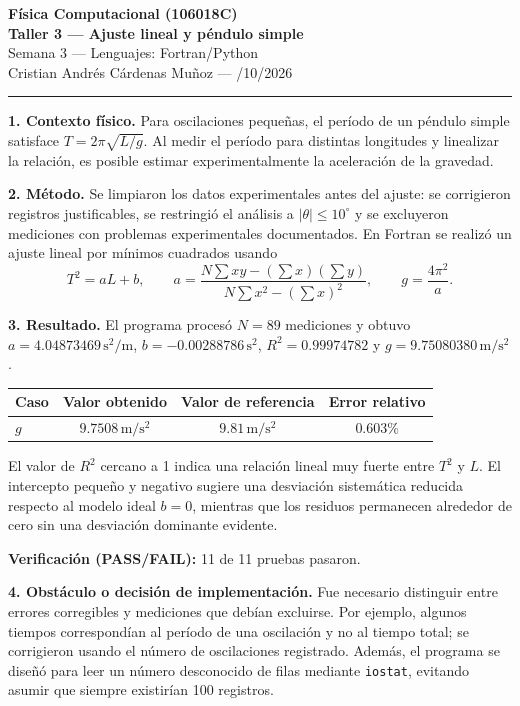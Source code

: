 \documentclass[11pt]{article}
\begin{document}
\begin{center}
{\large\bfseries Física Computacional (106018C)} \\[2pt]
{\bfseries Taller 3 --- Ajuste lineal y péndulo simple} \\[2pt]
Semana 3 \quad --- \quad Lenguajes: Fortran/Python \\[2pt]
Cristian Andrés Cárdenas Muñoz \quad --- /10/2026
\end{center}

\vspace{4pt}
\hrule
\vspace{6pt}

\textbf{1. Contexto físico.}
Para oscilaciones pequeñas, el período de un péndulo simple satisface $T=2\pi\sqrt{L/g}$. Al medir el período para distintas longitudes y linealizar la relación, es posible estimar experimentalmente la aceleración de la gravedad.

\textbf{2. Método.}
Se limpiaron los datos experimentales antes del ajuste: se corrigieron registros justificables, se restringió el análisis a $|\theta|\leq 10^{\circ}$ y se excluyeron mediciones con problemas experimentales documentados. En Fortran se realizó un ajuste lineal por mínimos cuadrados usando
\[
T^2=aL+b, \qquad a=\frac{N\sum xy-(\sum x)(\sum y)}{N\sum x^2-(\sum x)^2}, \qquad g=\frac{4\pi^2}{a}.
\]

\textbf{3. Resultado.}
El programa procesó $N=89$ mediciones y obtuvo $a=4.04873469\,\mathrm{s^2/m}$, $b=-0.00288786\,\mathrm{s^2}$, $R^2=0.99974782$ y $g=9.75080380\,\mathrm{m/s^2}$.

\begin{center}
\begin{tabular}{lccc}
\toprule
Caso & Valor obtenido & Valor de referencia & Error relativo \\
\midrule
$g$ & $9.7508\,\mathrm{m/s^2}$ & $9.81\,\mathrm{m/s^2}$ & $0.603\%$ \\
\bottomrule
\end{tabular}
\end{center}

El valor de $R^2$ cercano a 1 indica una relación lineal muy fuerte entre $T^2$ y $L$. El intercepto pequeño y negativo sugiere una desviación sistemática reducida respecto al modelo ideal $b=0$, mientras que los residuos permanecen alrededor de cero sin una desviación dominante evidente.

\textbf{Verificación (PASS/FAIL):} 11 de 11 pruebas pasaron.

\textbf{4. Obstáculo o decisión de implementación.}
Fue necesario distinguir entre errores corregibles y mediciones que debían excluirse. Por ejemplo, algunos tiempos correspondían al período de una oscilación y no al tiempo total; se corrigieron usando el número de oscilaciones registrado. Además, el programa se diseñó para leer un número desconocido de filas mediante \texttt{iostat}, evitando asumir que siempre existirían 100 registros.
\end{document}

